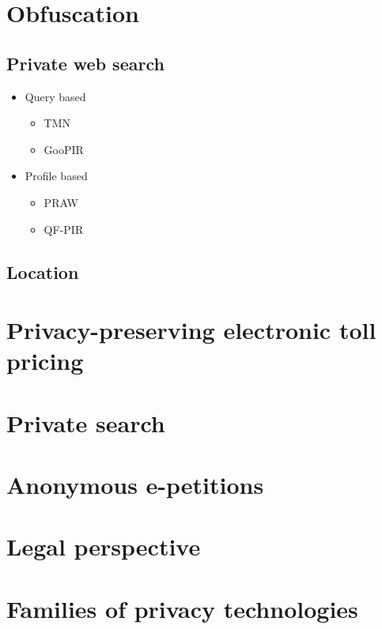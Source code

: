 \documentclass[a4paper,12pt,dutch]{article}
\begin{document}
\section{Obfuscation}
\subsection{Private web search}
\begin{itemize}
	\item Query based
	\begin{itemize}
		\item TMN
		\item GooPIR
	\end{itemize}
	\item Profile based
	\begin{itemize}
		\item PRAW
		\item QF-PIR
	\end{itemize}
\end{itemize}
\subsection{Location}

\section{Privacy-preserving electronic toll pricing}

\section{Private search}

\section{Anonymous e-petitions}

\section{Legal perspective}

\section{Families of privacy technologies}
\end{document}
